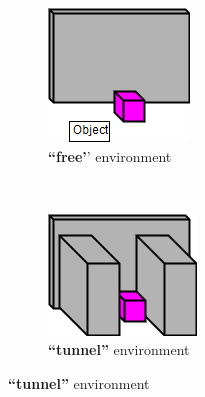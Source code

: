 \documentclass[conference]{IEEEtran}
\begin{document}
%
\begin{figure}[t]
      \centering
      \begin{subfigure}[t]{0.15\textwidth}
        \includegraphics[width=\textwidth]{images/FreeEnvironment.png}
        \caption{\textbf{``free'}' environment}
    \end{subfigure} \ \ \ \ \ \
    \begin{subfigure}[t]{0.15\textwidth}
        \includegraphics[width=\textwidth]{images/TunnelEnvironment.png}
        \caption{\textbf{``tunnel''} environment}
    \end{subfigure}
    

\end{figure}
\end{document}
